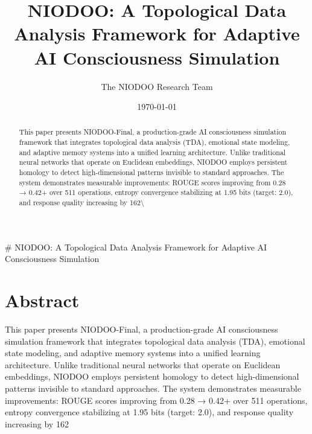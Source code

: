\documentclass[11pt,a4paper]{article}
\title{NIODOO: A Topological Data Analysis Framework for Adaptive AI Consciousness Simulation}
\author{The NIODOO Research Team}
\date{\today}
\begin{document}
\maketitle

\begin{abstract}
This paper presents NIODOO-Final, a production-grade AI consciousness simulation framework that integrates topological data analysis (TDA), emotional state modeling, and adaptive memory systems into a unified learning architecture. Unlike traditional neural networks that operate on Euclidean embeddings, NIODOO employs persistent homology to detect high-dimensional patterns invisible to standard approaches. The system demonstrates measurable improvements: ROUGE scores improving from 0.28 → 0.42+ over 511 operations, entropy convergence stabilizing at 1.95 bits (target: 2.0), and response quality increasing by 162\textbackslash{}%
\end{abstract}

    # NIODOO: A Topological Data Analysis Framework for Adaptive AI Consciousness Simulation

\section{Abstract}

This paper presents NIODOO-Final, a production-grade AI consciousness simulation framework that integrates topological data analysis (TDA), emotional state modeling, and adaptive memory systems into a unified learning architecture. Unlike traditional neural networks that operate on Euclidean embeddings, NIODOO employs persistent homology to detect high-dimensional patterns invisible to standard approaches. The system demonstrates measurable improvements: ROUGE scores improving from 0.28 → 0.42+ over 511 operations, entropy convergence stabilizing at 1.95 bits (target: 2.0), and response quality increasing by 162%
\end{document}
